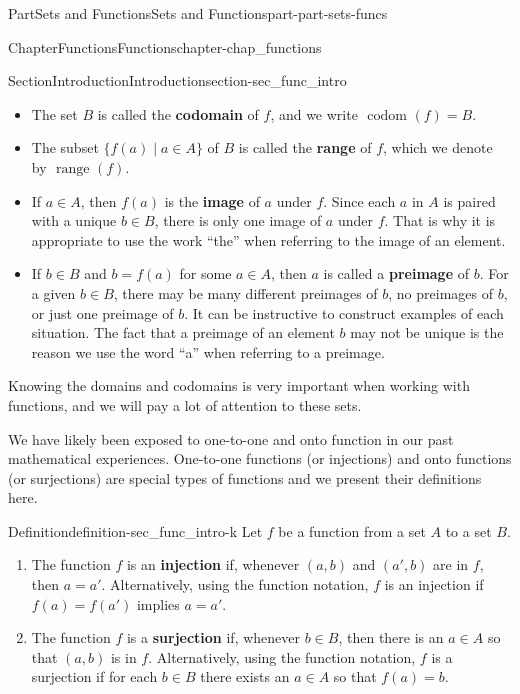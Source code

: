 \documentclass[oneside,10pt,]{book}
\newcommand{\terminology}[1]{\textbf{#1}}
\numberwithin{equation}{chapter}
\begin{document}
\begin{partptx}{Part}{Sets and Functions}{}{Sets and Functions}{}{}{part-part-sets-funcs}
\begin{chapterptx}{Chapter}{Functions}{}{Functions}{}{}{chapter-chap_functions}
\begin{sectionptx}{Section}{Introduction}{}{Introduction}{}{}{section-sec_func_intro}
\begin{itemize}[label=\textbullet]
\item{}The set \(B\) is called the \terminology{codomain}  of \(f\), and we write \(\text{ codom } (f) = B\).%
\item{}The subset \(\{f(a) \mid a \in A\}\) of \(B\) is called the \terminology{range}  of \(f\), which we denote by \(\text{ range } (f)\).%
\item{}If \(a \in A\), then \(f(a)\) is the \terminology{image}  of \(a\) under \(f\). Since each \(a\) in \(A\) is paired with a unique \(b \in B\), there is only one image of \(a\) under \(f\). That is why it is appropriate to use the work ``the'' when referring to the image of an element.%
\item{}If \(b \in B\) and \(b = f(a)\) for some \(a \in A\), then \(a\) is called a \terminology{preimage}  of \(b\). For a given \(b \in B\), there may be many different preimages of \(b\), no preimages of \(b\), or just one preimage of \(b\). It can be instructive to construct examples of each situation. The fact that a preimage of an element \(b\) may not be unique is the reason we use the word ``a'' when referring to a preimage.%
\end{itemize}
%
\par
Knowing the domains and codomains is very important when working with functions, and we will pay a lot of attention to these sets.%
\par
We have likely been exposed to one-to-one and onto function in our past mathematical experiences. One-to-one functions (or injections) and onto functions (or surjections) are special types of functions and we present their definitions here.%
\begin{definition}{Definition}{}{definition-sec_func_intro-k}%
%
%
%
Let \(f\) be a function from a set \(A\) to a set \(B\).%
\begin{enumerate}
\item{}The function \(f\) is an \terminology{injection} if, whenever \((a,b)\) and \((a',b)\) are in \(f\), then \(a=a'\). Alternatively, using the function notation, \(f\) is an injection if \(f(a)=f(a')\) implies \(a=a'\).%
\item{}The function \(f\) is a \terminology{surjection} if, whenever \(b \in B\), then there is an \(a \in A\) so that \((a,b)\) is in \(f\). Alternatively, using the function notation, \(f\) is a surjection if for each \(b \in B\) there exists an \(a \in A\) so that \(f(a)=b\).%

\end{enumerate}
\end{definition}
\end{sectionptx}
\end{chapterptx}
\end{partptx}
\end{document}
